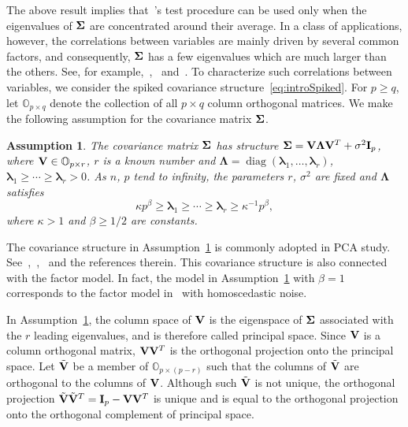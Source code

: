 \documentclass[review]{elsarticle}
\DeclareMathOperator{\mydiag}{diag}
\newcommand{\bfsym}[1]{\ensuremath{\boldsymbol{#1}}}
\def\blambda {\bfsym {\lambda}}        \def\bLambda {\bfsym {\Lambda}}
\theoremstyle{plain}
\newtheorem{assumption}{\quad\quad Assumption}
\theoremstyle{definition}
\theoremstyle{remark}
\begin{document}
    The above result implies that~\cite{Chen2010A}'s test procedure can be used only when the eigenvalues of $\bSigma$ are concentrated around their average. 
   In a class of applications, however, the correlations between variables are mainly driven by several common factors, and consequently, $\bSigma$ has a few eigenvalues which are much larger than the others.
    See, for example,~\cite{Jung2009PCA},~\cite{Cai2012Sparse} and~\cite{Fan2015Asymptotics}.
To characterize such correlations between variables, we consider the  spiked covariance structure~\eqref{eq:introSpiked}.
For $p\geq q$, let $\mathbb{O}_{p\times q}$ denote the collection of all $p\times q$ column orthogonal matrices.
We make the following assumption for the covariance matrix $\bSigma$.
\begin{assumption}\label{theModel}
    The covariance matrix $\bSigma$ has structure $ \bSigma=\BV\bLambda \BV^T+\sigma^2 \BI_p$, where $\mathbf{V}\in\mathbb{O}_{p\times r}$, $r$ is a known number and $\bLambda=\mydiag(\blambda_{1},\ldots,\blambda_{r})$, 
 $\blambda_{1}\geq \cdots \geq \blambda_{r}>0$.
As $n$, $p$ tend to infinity, the parameters
$r$, $\sigma^2$ are fixed and $\bLambda$ satisfies     
    \begin{equation*}
        \kappa p^{\beta}\geq \blambda_{1}\geq \cdots \geq\blambda_{r}\geq \kappa^{-1}p^{\beta},
\end{equation*}
where $\kappa>1$ and $\beta\geq {1}/{2}$ are constants.
\end{assumption}

The covariance structure in Assumption~\ref{theModel} is commonly adopted in PCA study.
See~\cite{Cai2012Sparse},~\cite{Birnbaum2013},~\cite{Passemier2015} and the references therein.
This covariance structure is also connected with the factor model.
In fact, the model in Assumption~\ref{theModel} with $\beta=1$
corresponds to the factor model in~\cite{Ma2015A} with homoscedastic noise.

In Assumption~\ref{theModel}, the column space of $\mathbf{V}$ is the eigenspace of $\bSigma$ associated with the $r$ leading eigenvalues, and is therefore called principal space. Since $\mathbf{V}$ is a column orthogonal matrix, $\mathbf{V} \mathbf{V}^T$ is the orthogonal projection onto the principal space.
Let $\tilde{\mathbf{V}}$ be a member of $\mathbb{O}_{p\times (p-r)}$ such that the columns of $\tilde{\mathbf{V}}$ are orthogonal to the columns of  $\mathbf{V}$.
 Although such $\tilde{\mathbf{V}}$ is not unique, the orthogonal projection  $\tilde{\mathbf{V}}\tilde{\mathbf{V}}^T=\mathbf{I}_p-\mathbf{V} \mathbf{V}^T$ is unique and is equal to the orthogonal projection onto the orthogonal complement of principal space.
\end{document}
